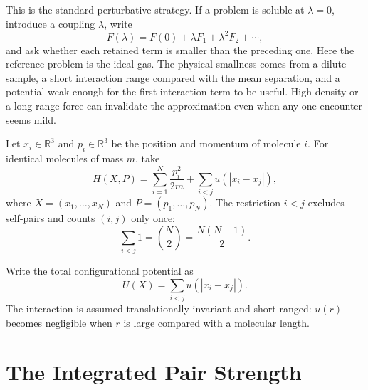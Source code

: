 This is the standard perturbative strategy.  If a problem is soluble at
\(\lambda=0\), introduce a coupling \(\lambda\), write
\begin{equation}
 F(\lambda)=F(0)+\lambda F_1+\lambda^2F_2+\cdots,
 \label{eq:sm6-perturbative-template}
\end{equation}
and ask whether each retained term is smaller than the preceding one.  Here
the reference problem is the ideal gas.  The physical smallness comes from a
dilute sample, a short interaction range compared with the mean separation,
and a potential weak enough for the first interaction term to be useful.
High density or a long-range force can invalidate the approximation even
when any one encounter seems mild.

Let \(x_i\in\mathbb R^3\) and \(p_i\in\mathbb R^3\) be the position and
momentum of molecule \(i\).  For identical molecules of mass \(m\), take
\begin{equation}
 H(X,P)=
 \sum_{i=1}^{N}\frac{p_i^2}{2m}
 +\sum_{i<j}u\!\left(|x_i-x_j|\right),
 \label{eq:sm6-interacting-hamiltonian}
\end{equation}
where \(X=(x_1,\ldots,x_N)\) and \(P=(p_1,\ldots,p_N)\).  The restriction
\(i<j\) excludes self-pairs and counts \((i,j)\) only once:
\begin{equation}
 \sum_{i<j}1=\binom{N}{2}=\frac{N(N-1)}{2}.
 \label{eq:sm6-pair-count}
\end{equation}

\begin{classroomqa}
\end{classroomqa}

Write the total configurational potential as
\begin{equation}
 U(X)=\sum_{i<j}u\!\left(|x_i-x_j|\right).
 \label{eq:sm6-total-potential}
\end{equation}
The interaction is assumed translationally invariant and short-ranged:
\(u(r)\) becomes negligible when \(r\) is large compared with a molecular
length.

\section{The Integrated Pair Strength}

